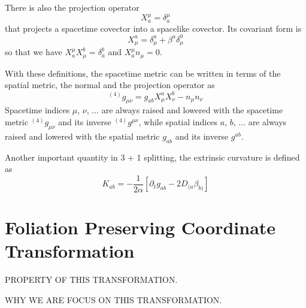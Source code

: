\documentclass[letterpaper,nofootinbib,prd,amsmath,onecolumn]{revtex4-1}
\begin{document}
There is also the projection operator
\begin{equation}\label{projection 1}
X^{\mu}_{a} = \delta^{\mu}_{a}
\end{equation}
that projects a spacetime covector into a spacelike covector. Its covariant form is
\begin{equation}\label{projection 2}
X^{a}_{\mu} = \delta^{a}_{\mu} + \beta^{a}\delta^{0}_{\mu}
\end{equation}
so that we have $X^{\mu}_{a}X^{b}_{\mu} = \delta^{b}_{a}$ and $X^{\mu}_{a}n_{\mu} = 0$. 

With these definitions, the spacetime metric can be written in terms of the spatial metric, the normal and the projection operator as
\begin{equation}\label{spacetime metric 3 + 1}
^{(4)}g_{\mu\nu} = g_{ab}X^{a}_{\mu}X^{b}_{\nu} - n_{\mu}n_{\nu}
\end{equation}
Spacetime indices $\mu$, $\nu$, ... are always raised and lowered with the spacetime metric $^{(4)}g_{\mu\nu}$ and its inverse $^{(4)}g^{\mu\nu}$, while spatial indices $a$, $b$, ... are always raised and lowered with the spatial metric $g_{ab}$ and its inverse $g^{ab}$. 

Another important quantity in 3 + 1 splitting, the extrinsic curvature is defined as
\begin{equation}
K_{ab} = - \frac{1}{2\alpha}\left[\partial_{t}g_{ab} - 2D_{(a}\beta_{b)}\right]
\end{equation}
\section{Foliation Preserving Coordinate Transformation}\label{transform}
{\bf {\color{red}PROPERTY OF THIS TRANSFORMATION.

WHY WE ARE FOCUS ON THIS TRANSFORMATION.}} 
\end{document}

